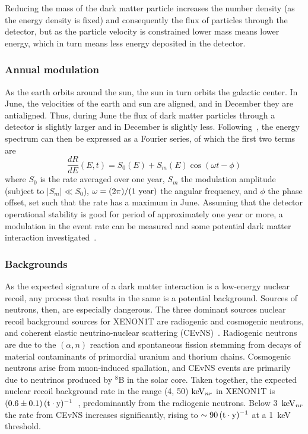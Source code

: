 Reducing the mass of the dark matter particle increases the number density (as the energy density is fixed) and consequently the flux of particles through the detector, but as the particle velocity is constrained lower mass means lower energy, which in turn means less energy deposited in the detector.

\subsubsection{Annual modulation}

As the earth orbits around the sun, the sun in turn orbits the galactic center. In June, the velocities of the earth and sun are aligned, and in December they are antialigned. Thus, during June the flux of dark matter particles through a detector is slightly larger and in December is slightly less. Following~\cite{Freese:2012xd}, the energy spectrum can then be expressed as a Fourier series, of which the first two terms are
\begin{equation}\label{eq:modulation}
\frac{dR}{dE}(E,t) = S_0(E) + S_m(E)\cos (\omega t - \phi)
\end{equation}
where $S_0$ is the rate averaged over one year, $S_m$ the modulation amplitude (subject to $|S_m| \ll S_0$), $\omega = (2\pi)/(1~\mathrm{year})$ the angular frequency, and $\phi$ the phase offset, set such that the rate has a maximum in June. Assuming that the detector operational stability is good for period of approximately one year or more, a modulation in the event rate can be measured and some potential dark matter interaction investigated~\cite{Aprile:2017yea}.

\subsubsection{Backgrounds}

As the expected signature of a dark matter interaction is a low-energy nuclear recoil, any process that results in the same is a potential background. Sources of neutrons, then, are especially dangerous. The three dominant sources nuclear recoil background sources for XENON1T are radiogenic and cosmogenic neutrons, and coherent elastic neutrino-nuclear scattering (CEvNS)~\cite{Freedman:1977,Scholberg:2015}. Radiogenic neutrons are due to the $(\alpha,n)$ reaction and spontaneous fission stemming from decays of material contaminants of primordial uranium and thorium chains. Cosmogenic neutrons arise from muon-induced spallation, and CEvNS events are primarily due to neutrinos produced by $^8$B in the solar core. Taken together, the expected nuclear recoil background rate in the range (4, 50) $\mathrm{keV}_{nr}$ in XENON1T is $(0.6 \pm 0.1)\,\mathrm{(t\cdot y)^{-1}}$~\cite{Aprile:2015uzo}, predominantly from the radiogenic neutrons. Below 3~$\mathrm{keV}_{nr}$ the rate from CEvNS increases significantly, rising to $\sim 90\,\mathrm{(t\cdot y)^{-1}}$ at a 1~keV threshold.

